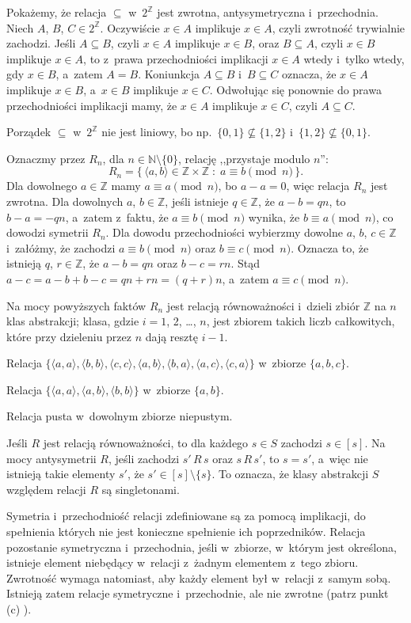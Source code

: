 
\exercise %
Pokażemy, że relacja $\subseteq$ w~$2^\mathbb{Z}$ jest zwrotna, antysymetryczna i~przechodnia.
Niech $A$, $B$, $C\in2^\mathbb{Z}$.
Oczywiście $x\in A$ implikuje $x\in A$, czyli zwrotność trywialnie zachodzi.
Jeśli $A\subseteq B$, czyli $x\in A$ implikuje $x\in B$, oraz $B\subseteq A$, czyli $x\in B$ implikuje $x\in A$, to z~prawa przechodniości implikacji $x\in A$ wtedy i~tylko wtedy, gdy $x\in B$, a~zatem $A=B$.
Koniunkcja $A\subseteq B$ i~$B\subseteq C$ oznacza, że $x\in A$ implikuje $x\in B$, a~$x\in B$ implikuje $x\in C$.
Odwołując się ponownie do prawa przechodniości implikacji mamy, że $x\in A$ implikuje $x\in C$, czyli $A\subseteq C$.

Porządek $\subseteq$ w~$2^\mathbb{Z}$ nie jest liniowy, bo np.\ $\{0,1\}\nsubseteq\{1,2\}$ i~$\{1,2\}\nsubseteq\{0,1\}$.

\exercise %
Oznaczmy przez $R_n$, dla $n\in\mathbb{N}\setminus\{0\}$, relację ,,przystaje modulo $n$'':
\[
	R_n = \{\,\langle a,b\rangle\in\mathbb{Z}\times\mathbb{Z}\;:\;a\equiv b\!\!\!\pmod{n}\,\}.
\]
Dla dowolnego $a\in\mathbb{Z}$ mamy $a\equiv a\pmod{n}$, bo $a-a=0$, więc relacja $R_n$ jest zwrotna.
Dla dowolnych $a$, $b\in\mathbb{Z}$, jeśli istnieje $q\in\mathbb{Z}$, że $a-b=qn$, to $b-a=-qn$, a~zatem z~faktu, że $a\equiv b\pmod{n}$ wynika, że $b\equiv a\pmod{n}$, co dowodzi symetrii $R_n$.
Dla dowodu przechodniości wybierzmy dowolne $a$, $b$, $c\in\mathbb{Z}$ i~załóżmy, że zachodzi $a\equiv b\pmod{n}$ oraz $b\equiv c\pmod{n}$.
Oznacza to, że istnieją $q$, $r\in\mathbb{Z}$, że $a-b=qn$ oraz $b-c=rn$.
Stąd $a-c=a-b+b-c=qn+rn=(q+r)n$, a~zatem $a\equiv c\pmod{n}$.

Na mocy powyższych faktów $R_n$ jest relacją równoważności i~dzieli zbiór $\mathbb{Z}$ na $n$ klas abstrakcji;  klasa, gdzie $i=1$, 2, \dots, $n$, jest zbiorem takich liczb całkowitych, które przy dzieleniu przez $n$ dają resztę $i-1$.

\exercise %
\subexercise
Relacja $\{\langle a,a\rangle,\langle b,b\rangle,\langle c,c\rangle,\langle a,b\rangle,\langle b,a\rangle,\langle a,c\rangle,\langle c,a\rangle\}$ w~zbiorze $\{a,b,c\}$.

\subexercise
Relacja $\{\langle a,a\rangle, \langle a,b\rangle,\langle b,b\rangle\}$ w~zbiorze $\{a,b\}$.

\subexercise
Relacja pusta w~dowolnym zbiorze niepustym.

\exercise %
Jeśli $R$ jest relacją równoważności, to dla każdego $s\in S$ zachodzi $s\in[s]$.
Na mocy antysymetrii $R$, jeśli zachodzi $s'\,R\,s$ oraz $s\,R\,s'$, to $s=s'$, a~więc nie istnieją takie elementy $s'$, że $s'\in[s]\setminus\{s\}$.
To oznacza, że klasy abstrakcji $S$ względem relacji $R$ są singletonami.

\exercise %
Symetria i~przechodniość relacji zdefiniowane są za pomocą implikacji, do spełnienia których nie jest konieczne spełnienie ich poprzedników.
Relacja pozostanie symetryczna i~przechodnia, jeśli w~zbiorze, w~którym jest określona, istnieje element niebędący w~relacji z~żadnym elementem z~tego zbioru.
Zwrotność wymaga natomiast, aby każdy element był w~relacji z~samym sobą.
Istnieją zatem relacje symetryczne i~przechodnie, ale nie zwrotne (patrz punkt (c) ).
